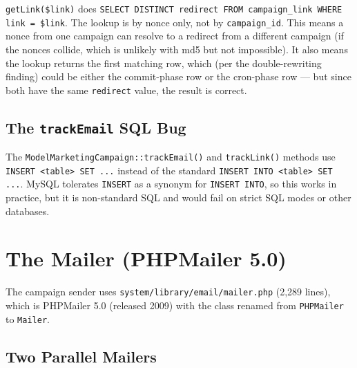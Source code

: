 \documentclass[11pt,a4paper]{article}
\begin{document}
\begin{findingbox}
\texttt{getLink(\$link)} does \texttt{SELECT DISTINCT redirect
FROM campaign\_link WHERE link = \$link}. The lookup is by nonce
only, not by \texttt{campaign\_id}. This means a nonce from one
campaign can resolve to a redirect from a different campaign
(if the nonces collide, which is unlikely with md5 but not
impossible). It also means the lookup returns the first matching
row, which (per the double-rewriting finding) could be either
the commit-phase row or the cron-phase row --- but since both
have the same \texttt{redirect} value, the result is correct.
\end{findingbox}

\subsection{The \texttt{trackEmail} SQL Bug}

\begin{findingbox}
The \texttt{ModelMarketingCampaign::trackEmail()} and
\texttt{trackLink()} methods use \texttt{INSERT <table> SET ...}
instead of the standard \texttt{INSERT INTO <table> SET ...}.
MySQL tolerates \texttt{INSERT} as a synonym for \texttt{INSERT
INTO}, so this works in practice, but it is non-standard SQL and
would fail on strict SQL modes or other databases.
\end{findingbox}

\section{The Mailer (PHPMailer 5.0)}\label{sec:mailer}

The campaign sender uses \texttt{system/library/email/mailer.php}
(2,289 lines), which is PHPMailer 5.0 (released 2009) with the
class renamed from \texttt{PHPMailer} to \texttt{Mailer}.

\subsection{Two Parallel Mailers}
\end{document}
